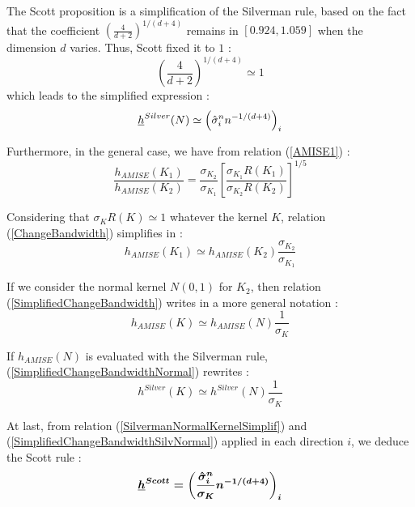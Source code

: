 {  The Scott proposition is  a simplification of the Silverman rule, based on the fact that the coefficient $\left(\frac{4}{d+2}\right)^{1/(d+4)}$ remains in $[0.924, 1.059]$ when the dimension $d$ varies. Thus, Scott fixed it to $1$ :
  \begin{equation}
    \label{coefficientScott}
    \left(\frac{4}{d+2}\right)^{1/(d+4)} \simeq 1
  \end{equation}
  which leads to the simplified expression :
  \begin{equation}
    \label{SilvermanNormalKernelSimplif}
    {\underline{h}}^{Silver}(N) \simeq \left( \hat{\sigma}_i^n n^{-1/(d+4)}\right)_i
  \end{equation}




  Furthermore, in the general case, we have from relation (\ref{AMISE1}) :
  \begin{equation}
    \label{ChangeBandwidth}
    \frac{h_{AMISE}(K_1)}{h_{AMISE}(K_2)}=\frac{\sigma_{K_2}}{\sigma_{K_1}}\left[\frac{\sigma_{K_1}R(K_1)}{\sigma_{K_2}R(K_2)}\right]^{1/5}
  \end{equation}

  Considering that $\sigma_{K}R(K) \simeq 1$ whatever the kernel $K$,   relation (\ref{ChangeBandwidth}) simplifies in :
  \begin{equation}
    \label{SimplifiedChangeBandwidth}
    h_{AMISE}(K_1) \simeq h_{AMISE}(K_2)\frac{\sigma_{K_2}}{\sigma_{K_1}}
  \end{equation}





  If we consider the normal kernel $N(0,1)$ for $K_2$, then relation (\ref{SimplifiedChangeBandwidth}) writes in a more general notation :
  \begin{equation}
    \label{SimplifiedChangeBandwidthNormal}
    h_{AMISE}(K) \simeq h_{AMISE}(N)\frac{1}{\sigma_{K}}
  \end{equation}

  If $h_{AMISE}(N)$ is evaluated with the Silverman rule, (\ref{SimplifiedChangeBandwidthNormal}) rewrites :
  \begin{equation}
    \label{SimplifiedChangeBandwidthSilvNormal}
    h^{Silver}(K) \simeq h^{Silver}(N)\frac{1}{\sigma_{K}}
  \end{equation}



  At last, from relation (\ref{SilvermanNormalKernelSimplif}) and (\ref{SimplifiedChangeBandwidthSilvNormal}) applied in each direction $i$, we deduce the Scott rule :
  \begin{equation}
    \label{ScottRule}
    \boldsymbol{{\underline{h}}^{Scott} = \left(\frac{\hat{\sigma}_i^n}{\sigma_K}n^{-1/(d+4)}\right)_i}
  \end{equation}




}
